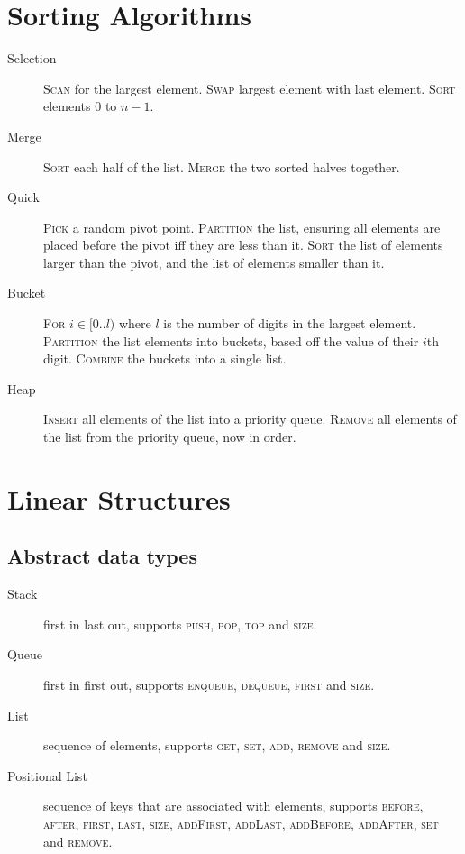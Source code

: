 \documentclass[landscape]{cheat}
\begin{document}
\begin{multicols}{3}
\section{Sorting Algorithms}
\begin{description}
    \item[Selection]
        \textsc{Scan} for the largest element.
        \textsc{Swap} largest element with last element.
        \textsc{Sort} elements 0 to $n-1$.
    \item[Merge]
        \textsc{Sort} each half of the list.
        \textsc{Merge} the two sorted halves together.
    \item[Quick]
        \textsc{Pick} a random pivot point.
        \textsc{Partition} the list, ensuring all elements are placed before the pivot iff they are less than it.
        \textsc{Sort} the list of elements larger than the pivot, and the list of elements smaller than it.
    \item[Bucket]
        \textsc{For} $i \in [0..l)$ where $l$ is the number of digits in the largest element.
        \textsc{Partition} the list elements into buckets, based off the value of their $i$th digit.
        \textsc{Combine} the buckets into a single list.
    \item[Heap]
        \textsc{Insert} all elements of the list into a priority queue.
        \textsc{Remove} all elements of the list from the priority queue, now in order.
\end{description}

\section{Linear Structures}

\subsection{Abstract data types}
\begin{description}
    \item[Stack]
        first in last out,
        supports \textsc{push}, \textsc{pop}, \textsc{top} and \textsc{size}.
    \item[Queue]
        first in first out,
        supports \textsc{enqueue}, \textsc{dequeue}, \textsc{first} and \textsc{size}.
    \item[List]
        sequence of elements,
        supports \textsc{get}, \textsc{set}, \textsc{add}, \textsc{remove} and \textsc{size}.
    \item[Positional List]
        sequence of keys that are associated with elements,
        supports \textsc{before}, \textsc{after}, \textsc{first}, \textsc{last}, \textsc{size},
        \textsc{addFirst}, \textsc{addLast}, \textsc{addBefore}, \textsc{addAfter}, \textsc{set} and \textsc{remove}.
\end{description}


\end{multicols}
\end{document}
